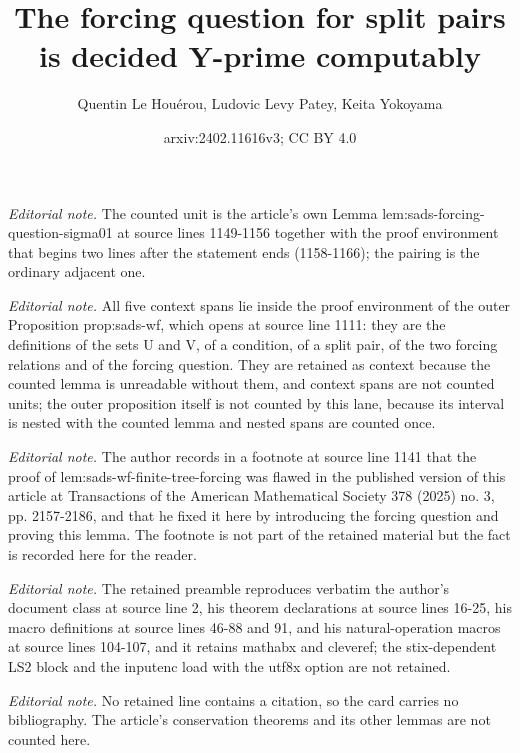 \documentclass{article}
\title{The forcing question for split pairs is decided Y-prime computably}
\author{Quentin Le Houérou, Ludovic Levy Patey, Keita Yokoyama}
\date{arxiv:2402.11616v3; CC BY 4.0}
\numberwithin{theorem}{section}
\begin{document}
\maketitle
\noindent\textit{Editorial note.} The counted unit is the article's own Lemma lem:sads-forcing-question-sigma01 at source lines 1149-1156 together with the proof environment that begins two lines after the statement ends (1158-1166); the pairing is the ordinary adjacent one.\par\medskip
\noindent\textit{Editorial note.} All five context spans lie inside the proof environment of the outer Proposition prop:sads-wf, which opens at source line 1111: they are the definitions of the sets U and V, of a condition, of a split pair, of the two forcing relations and of the forcing question. They are retained as context because the counted lemma is unreadable without them, and context spans are not counted units; the outer proposition itself is not counted by this lane, because its interval is nested with the counted lemma and nested spans are counted once.\par\medskip
\noindent\textit{Editorial note.} The author records in a footnote at source line 1141 that the proof of lem:sads-wf-finite-tree-forcing was flawed in the published version of this article at Transactions of the American Mathematical Society 378 (2025) no. 3, pp. 2157-2186, and that he fixed it here by introducing the forcing question and proving this lemma. The footnote is not part of the retained material but the fact is recorded here for the reader.\par\medskip
\noindent\textit{Editorial note.} The retained preamble reproduces verbatim the author's document class at source line 2, his theorem declarations at source lines 16-25, his macro definitions at source lines 46-88 and 91, and his natural-operation macros at source lines 104-107, and it retains mathabx and cleveref; the stix-dependent LS2 block and the inputenc load with the utf8x option are not retained.\par\medskip
\noindent\textit{Editorial note.} No retained line contains a citation, so the card carries no bibliography. The article's conservation theorems and its other lemmas are not counted here.\par\medskip
\end{document}
